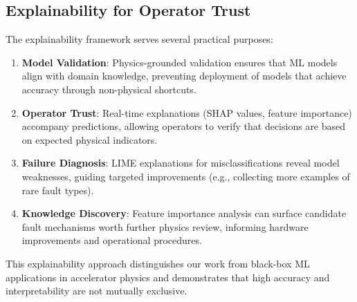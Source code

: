 \subsection{Explainability for Operator Trust}

The explainability framework serves several practical purposes:

\begin{enumerate}
    \item \textbf{Model Validation}: Physics-grounded validation ensures that ML models align with domain knowledge, preventing deployment of models that achieve accuracy through non-physical shortcuts.

    \item \textbf{Operator Trust}: Real-time explanations (SHAP values, feature importance) accompany predictions, allowing operators to verify that decisions are based on expected physical indicators.

    \item \textbf{Failure Diagnosis}: LIME explanations for misclassifications reveal model weaknesses, guiding targeted improvements (e.g., collecting more examples of rare fault types).

    \item \textbf{Knowledge Discovery}: Feature importance analysis can surface candidate fault mechanisms worth further physics review, informing hardware improvements and operational procedures.
\end{enumerate}

This explainability approach distinguishes our work from black-box ML applications in accelerator physics and demonstrates that high accuracy and interpretability are not mutually exclusive.
